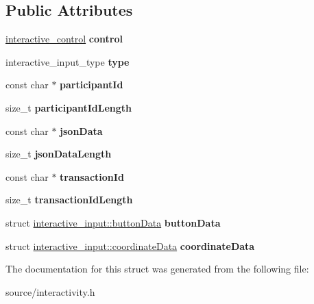 \subsection*{Public Attributes}
\begin{DoxyCompactItemize}
\item 
\mbox{\label{structinteractive__input_ad6d5f6119bff198fffdbf80983ef1116}} 
\mbox{\hyperlink{structinteractive__control}{interactive\+\_\+control}} {\bfseries control}
\item 
\mbox{\label{structinteractive__input_aeac5c04960be1d26422b88a89841ac57}} 
interactive\+\_\+input\+\_\+type {\bfseries type}
\item 
\mbox{\label{structinteractive__input_ade05a03d25ad8463dbcfea2afff74f03}} 
const char $\ast$ {\bfseries participant\+Id}
\item 
\mbox{\label{structinteractive__input_a86b0c8a7eb41c0c8c7459864ddd44347}} 
size\+\_\+t {\bfseries participant\+Id\+Length}
\item 
\mbox{\label{structinteractive__input_a5110157c84774df95dc3bcea8ad03a8c}} 
const char $\ast$ {\bfseries json\+Data}
\item 
\mbox{\label{structinteractive__input_a369891885d6c82df711ffdf00ed9721b}} 
size\+\_\+t {\bfseries json\+Data\+Length}
\item 
\mbox{\label{structinteractive__input_a7e8bdd69904486dcd857da3e6160a405}} 
const char $\ast$ {\bfseries transaction\+Id}
\item 
\mbox{\label{structinteractive__input_aad326d8f738cdac83280741e9c0f794e}} 
size\+\_\+t {\bfseries transaction\+Id\+Length}
\item 
\mbox{\label{structinteractive__input_ab3ec7b6c529fe57cd0ce8c530377b1ae}} 
struct \mbox{\hyperlink{structinteractive__input_1_1button_data}{interactive\+\_\+input\+::button\+Data}} {\bfseries button\+Data}
\item 
\mbox{\label{structinteractive__input_ad8791985437c89e8f86812110c48b786}} 
struct \mbox{\hyperlink{structinteractive__input_1_1coordinate_data}{interactive\+\_\+input\+::coordinate\+Data}} {\bfseries coordinate\+Data}
\end{DoxyCompactItemize}


The documentation for this struct was generated from the following file\+:\begin{DoxyCompactItemize}
\item 
source/interactivity.\+h\end{DoxyCompactItemize}

